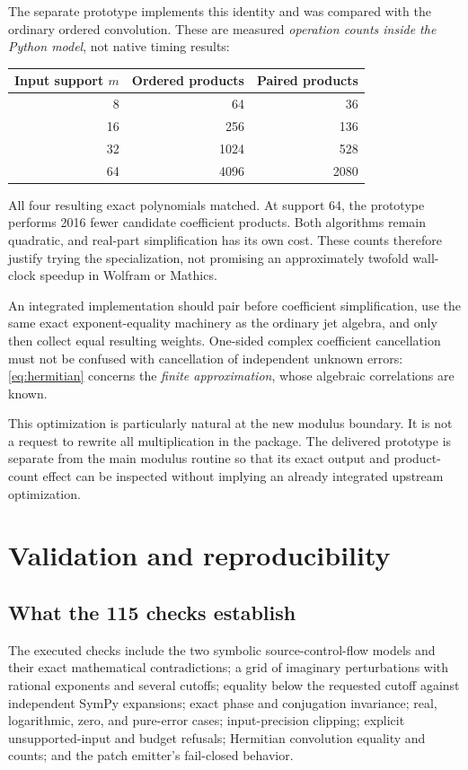 \documentclass[11pt]{article}
\newcommand{\code}[1]{\texttt{\detokenize{#1}}}
\theoremstyle{remark}\newtheorem{remark}[theorem]{Remark}
\begin{document}
The separate \code{hermitian_square} prototype implements this identity and
was compared with the ordinary ordered convolution. These are measured
\emph{operation counts inside the Python model}, not native timing results:
\begin{center}
\begin{tabular}{@{}rrr@{}}
\toprule
Input support \(m\) & Ordered products & Paired products\\
\midrule
8 & 64 & 36\\
16 & 256 & 136\\
32 & 1024 & 528\\
64 & 4096 & 2080\\
\bottomrule
\end{tabular}
\end{center}
All four resulting exact polynomials matched. At support 64, the prototype
performs 2016 fewer candidate coefficient products. Both algorithms remain
quadratic, and real-part simplification has its own cost. These counts therefore
justify trying the specialization, not promising an approximately twofold
wall-clock speedup in Wolfram or Mathics.

An integrated implementation should pair before coefficient simplification,
use the same exact exponent-equality machinery as the ordinary jet algebra,
and only then collect equal resulting weights. One-sided complex coefficient
cancellation must not be confused with cancellation of independent unknown
errors: \eqref{eq:hermitian} concerns the \emph{finite approximation}, whose
algebraic correlations are known.

This optimization is particularly natural at the new modulus boundary. It is
not a request to rewrite all multiplication in the package. The delivered
prototype is separate from the main modulus routine so that its exact output
and product-count effect can be inspected without implying an already integrated
upstream optimization.

\section{Validation and reproducibility}
\subsection{What the 115 checks establish}
The executed checks include the two symbolic source-control-flow models and
their exact mathematical contradictions; a grid of imaginary perturbations
with rational exponents and several cutoffs; equality below the requested
cutoff against independent SymPy expansions; exact phase and conjugation
invariance; real, logarithmic, zero, and pure-error cases; input-precision clipping;
explicit unsupported-input and budget refusals; Hermitian convolution equality
and counts; and the patch emitter's fail-closed behavior.
\end{document}
